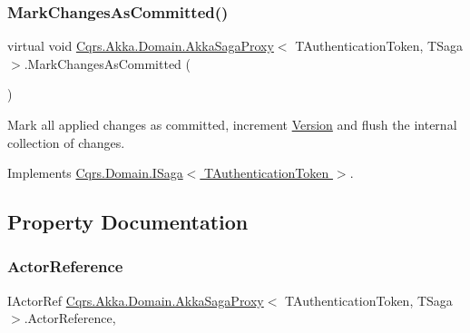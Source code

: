 \subsubsection{\texorpdfstring{Mark\+Changes\+As\+Committed()}{MarkChangesAsCommitted()}}
{\footnotesize\ttfamily virtual void \hyperlink{classCqrs_1_1Akka_1_1Domain_1_1AkkaSagaProxy}{Cqrs.\+Akka.\+Domain.\+Akka\+Saga\+Proxy}$<$ T\+Authentication\+Token, T\+Saga $>$.Mark\+Changes\+As\+Committed (\begin{DoxyParamCaption}{ }\end{DoxyParamCaption})\hspace{0.3cm}{\ttfamily [virtual]}}



Mark all applied changes as committed, increment \hyperlink{classCqrs_1_1Akka_1_1Domain_1_1AkkaSagaProxy_ab6272400fe5c6227a11cf5c93f752d4d_ab6272400fe5c6227a11cf5c93f752d4d}{Version} and flush the internal collection of changes. 



Implements \hyperlink{interfaceCqrs_1_1Domain_1_1ISaga_a85c75f80bc5be4bad7f1d9f1231bfba7_a85c75f80bc5be4bad7f1d9f1231bfba7}{Cqrs.\+Domain.\+I\+Saga$<$ T\+Authentication\+Token $>$}.



\subsection{Property Documentation}
\mbox{\label{classCqrs_1_1Akka_1_1Domain_1_1AkkaSagaProxy_a5f1a7eae545d74336856ca7ec7625334_a5f1a7eae545d74336856ca7ec7625334}} 
\subsubsection{\texorpdfstring{Actor\+Reference}{ActorReference}}
{\footnotesize\ttfamily I\+Actor\+Ref \hyperlink{classCqrs_1_1Akka_1_1Domain_1_1AkkaSagaProxy}{Cqrs.\+Akka.\+Domain.\+Akka\+Saga\+Proxy}$<$ T\+Authentication\+Token, T\+Saga $>$.Actor\+Reference\hspace{0.3cm}{\ttfamily [get]}, {\ttfamily [set]}}

